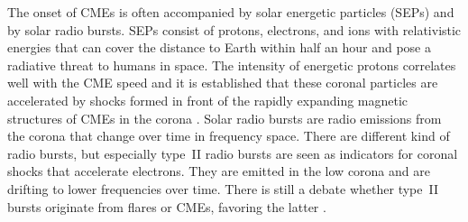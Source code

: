 The onset of CMEs is often accompanied by solar energetic particles (SEPs) and by solar radio bursts. SEPs consist of protons, electrons, and ions with relativistic energies that can cover the distance to Earth within half an hour and pose a radiative threat to humans in space. The intensity of energetic protons correlates well with the CME speed \citep{Kahler1978} and it is established that these coronal particles are accelerated by shocks formed in front of the rapidly expanding magnetic structures of CMEs in the corona \citep{Cliver1982,Gosling1993}. Solar radio bursts are radio emissions from the corona that change over time in frequency space. There are different kind of radio bursts, but especially type~II radio bursts are seen as indicators for coronal shocks that accelerate electrons. 
They are emitted in the low corona and are drifting to lower frequencies over time. There is still a debate whether type~II bursts originate from flares or CMEs, favoring the latter \citep{Gosling1993,Cliver2005,Cho2011}.

